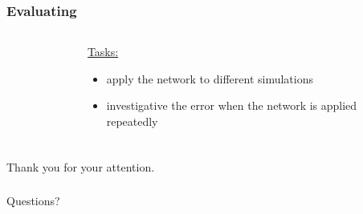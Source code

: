 \documentclass[18pt]{beamer}
\begin{document}
\begin{frame}[t]
  \frametitle{Evaluating}
  \begin{columns}[t]
    \begin{column}{0.5\textwidth}
      \begin{figure}[htb]
        \centering
        
      \end{figure}
    \end{column}
    \begin{column}{0.5\textwidth}
      \vspace{3.2cm}

      \large{\underline{Tasks:}}
      \begin{itemize}
      \item apply the network to different simulations
      \item investigative the error when the network is applied repeatedly
      \end{itemize}
      
    \end{column}
  \end{columns}
\end{frame}

\begin{frame}
  \frametitle{}
  \begin{center}
    \huge{Thank you for your attention.}    
  \end{center}
\end{frame}

\begin{frame}
  \frametitle{}
  \begin{center}
    \huge{Questions?}
  \end{center}
\end{frame}
\end{document}
